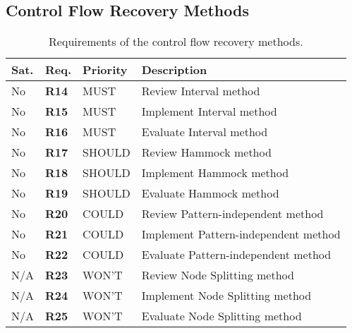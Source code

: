 
\subsection{Control Flow Recovery Methods}


\begin{table}[htbp]
	\begin{center}
		\begin{tabular}{|l|l|l|l|}
			\hline
			Sat. & Req. & Priority & Description \\
			\hline
			\rowcolor{light_red_3}
			No & \textbf{R14} & MUST & Review Interval method \\
			\rowcolor{light_red_3}
			No & \textbf{R15} & MUST & Implement Interval method \\
			\rowcolor{light_red_3}
			No & \textbf{R16} & MUST & Evaluate Interval method \\
			\hline
			\rowcolor{light_red_3}
			No & \textbf{R17} & SHOULD & Review Hammock method \\
			\rowcolor{light_red_3}
			No & \textbf{R18} & SHOULD & Implement Hammock method \\
			\rowcolor{light_red_3}
			No & \textbf{R19} & SHOULD & Evaluate Hammock method \\
			\hline
			\rowcolor{light_red_3}
			No & \textbf{R20} & COULD & Review Pattern-independent method \\
			\rowcolor{light_red_3}
			No & \textbf{R21} & COULD & Implement Pattern-independent method \\
			\rowcolor{light_red_3}
			No & \textbf{R22} & COULD & Evaluate Pattern-independent method \\
			\hline
			N/A & \textbf{R23} & WON'T & Review Node Splitting method \\
			N/A & \textbf{R24} & WON'T & Implement Node Splitting method \\
			N/A & \textbf{R25} & WON'T & Evaluate Node Splitting method \\
			\hline
		\end{tabular}
	\end{center}
	\caption{Requirements of the control flow recovery methods.}
	\label{tbl:eval_summary_of_control_flow_recovery_methods}
\end{table}
